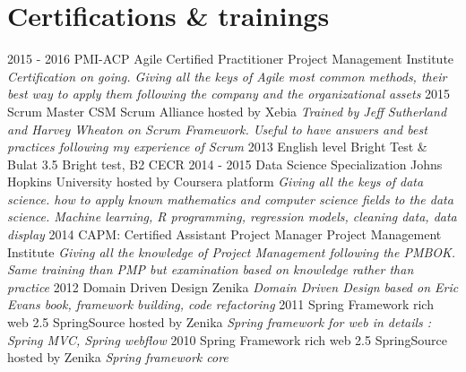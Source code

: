 \documentclass[]{bankcy}
\begin{document}
\section{Certifications \& trainings}
\begin{entrylist}
  \entry
    {2015 - 2016}
    {PMI-ACP Agile Certified Practitioner}
    {Project Management Institute}
    {\emph{Certification on going. Giving all the keys of Agile most common methods, their best way to apply them following the company and the organizational assets}}
  \entry
    {2015}
    {Scrum Master CSM}
    {Scrum Alliance hosted by Xebia}
    {\emph{Trained by Jeff Sutherland and Harvey Wheaton on Scrum Framework. Useful to have answers and best practices following my experience of Scrum}}
  \entry
  {2013}
  {English level}
  {Bright Test \& Bulat}
  {3.5 Bright test, B2 CECR}   
  \entry
    {2014 - 2015}
    {Data Science Specialization}
    {Johns Hopkins University hosted by Coursera platform}
    {\emph{Giving all the keys of data science. how to apply known mathematics and computer science fields to the data science. Machine learning, R programming, regression models, cleaning data, data display}}
  \entry
    {2014}
    {CAPM: Certified Assistant Project Manager}
    {Project Management Institute}
    {\emph{Giving all the knowledge of Project Management following the PMBOK. Same training than PMP but examination based on knowledge rather than practice}}
  \entry
    {2012}
    {Domain Driven Design}
    {Zenika}
    {\emph{Domain Driven Design based on Eric Evans book, framework building, code refactoring}}
  \entry
    {2011}
    {Spring Framework rich web 2.5}
    {SpringSource hosted by Zenika}
    {\emph{Spring framework for web in details : Spring MVC, Spring webflow}}
  \entry
    {2010}
    {Spring Framework rich web 2.5}
    {SpringSource hosted by Zenika}
    {\emph{Spring framework core}}

\end{entrylist}
\end{document}
